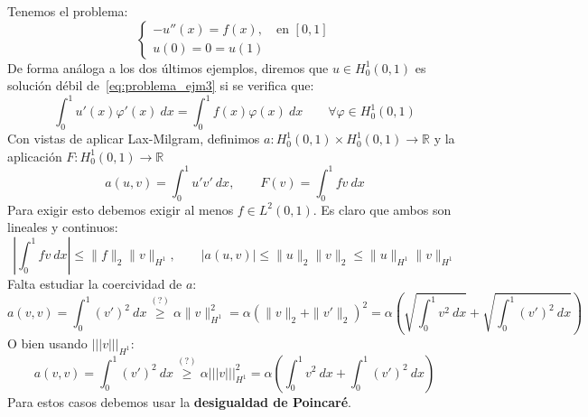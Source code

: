 \begin{ejemplo}
    Tenemos el problema:
    \begin{equation}\label{eq:problema_ejm3}
        \left\{\begin{array}{l}
                -u''(x) = f(x), \quad \text{en\ } [0,1] \\
                u(0) = 0 = u(1)
        \end{array}\right.
    \end{equation}
    De forma análoga a los dos últimos ejemplos, diremos que $u\in H^1_0(0,1)$ es solución débil de~\eqref{eq:problema_ejm3} si se verifica que:
    \begin{equation*}
        \int_{0}^{1} u'(x)\varphi'(x)~dx  = \int_{0}^{1} f(x)\varphi(x)~dx  \qquad \forall \varphi \in H^1_0(0,1)
    \end{equation*}
    Con vistas de aplicar Lax-Milgram, definimos $a:H_0^1(0,1)\times H_0^1(0,1)\to \mathbb{R}$ y la aplicación $F:H_0^1(0,1)\to\mathbb{R}$
    \begin{equation*}
        a(u,v) = \int_{0}^{1} u'v'~dx , \qquad F(v) = \int_{0}^{1} fv~dx 
    \end{equation*}
    Para exigir esto debemos exigir al menos $f\in L^2(0,1)$. Es claro que ambos son lineales y continuos:
    \begin{equation*}
        \left|\int_{0}^{1} fv~dx \right| \leq \|f\|_2 \|v\|_{H^1}, \qquad 
        |a(u,v)| \leq \|u\|_2\|v\|_2 \leq \|u\|_{H^1}\|v\|_{H^1}
    \end{equation*}
    Falta estudiar la coercividad de $a$:
    \begin{equation*}
        a(v,v) = \int_{0}^{1} {(v')}^{2}~dx \stackrel{(?)}{\geq} \alpha\|v\|^2_{H^1} = \alpha(\|v\|_2 + \|v'\|_2)^2 = \alpha\left(\sqrt{\int_{0}^{1} v^2~dx }+\sqrt{\int_{0}^{1} {(v')}^{2}~dx }\right)
    \end{equation*}
    O bien usando $\lvert\!\lvert\!\lvert v\rvert\!\rvert\!\rvert_{H^1}$:
    \begin{equation*}
        a(v,v) = \int_{0}^{1} {(v')}^{2}~dx \stackrel{(?)}{\geq} \alpha \lvert\!\lvert\!\lvert v\rvert\!\rvert\!\rvert^2_{H^1} = \alpha\left(\int_{0}^{1} v^2~dx +\int_{0}^{1} {(v')}^{2}~dx \right)
    \end{equation*}
    Para estos casos debemos usar la \textbf{desigualdad de Poincaré}.\\


\end{ejemplo}

